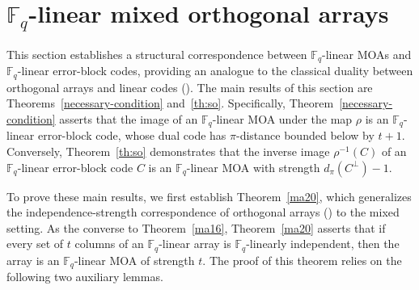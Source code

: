 \documentclass[11pt]{article}
\newtheorem{Definition and Notation}[Theorem]{Definition and Notation}
\begin{document}
\section{$\mathbb F_q$-linear mixed orthogonal arrays}

This section establishes a structural correspondence between $\mathbb{F}_q$-linear MOAs and $\mathbb{F}_q$-linear error-block codes, providing an analogue to the classical duality between orthogonal arrays and linear codes (\cite[Theorem 4.6]{HSS2012}). The main results of this section are Theorems~\ref{necessary-condition} and~\ref{th:so}. Specifically, Theorem~\ref{necessary-condition} asserts that the image of an $\mathbb{F}_q$-linear MOA under the map $\rho$ is an $\mathbb{F}_q$-linear error-block code, whose dual code has $\pi$-distance bounded below by $t+1$. Conversely, Theorem~\ref{th:so} demonstrates that the inverse image $\rho^{-1}(C)$ of an $\mathbb{F}_q$-linear error-block code $C$ is an $\mathbb{F}_q$-linear MOA with strength $d_\pi(C^\perp) - 1$.

To prove these main results, we first establish Theorem~\ref{ma20}, which generalizes the independence-strength correspondence of orthogonal arrays (\cite[Theorem 3.29]{HSS2012}) to the mixed setting. As the converse to Theorem~\ref{ma16}, Theorem~\ref{ma20} asserts that if every set of $t$ columns of an $\mathbb F_q$-linear array is $\mathbb F_q$-linearly independent, then the array is an $\mathbb F_q$-linear MOA of strength $t$. The proof of this theorem relies on the following two auxiliary lemmas.
\end{document}
